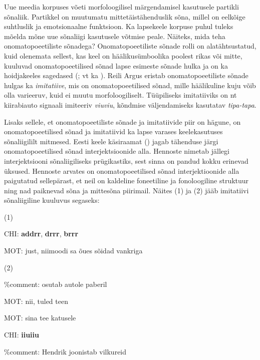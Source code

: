 \documentclass[12pt]{article}
\begin{document}
Uue meedia korpuses võeti morfoloogilisel märgendamisel kasutusele partikli sõnaliik. Partikkel on muutumatu mittetäistähenduslik sõna, millel on eelkõige suhtluslik ja emotsionaalne funktsioon. \citep[4]{UUSMEEDIA} Ka lapsekeele korpuse puhul tuleks mõelda mõne uue sõnaliigi kasutusele võtmise peale. Näiteks, mida teha onomatopoeetiliste sõnadega? Onomatopoeetiliste sõnade rolli on alatähtsustatud, kuid olenemata sellest, kas keel on häälikusümboolika poolest rikas või mitte, kuuluvad onomatopoeetilised sõnad lapse esimeste sõnade hulka ja on ka hoidjakeeles sagedased (\citealp{Laing_1}; vt ka \citealp{Laing_2}). Reili Argus eristab onomatopoeetiliste sõnade hulgas ka \emph{imitatiive}, mis on onomatopoeetilised sõnad, mille häälikuline kuju võib olla varieeruv, kuid ei muutu morfoloogiliselt. Tüüpiliseks imitatiiviks on nt kiirabiauto signaali imiteeriv \emph{viuviu}, kõndmise väljendamiseks kasutatav \emph{tipa-tapa}. \citep[19--22]{IMITATIIV}

Lisaks sellele, et onomatopoeetiliste sõnade ja imitatiivide piir on hägune, on onomatopoeetilised sõnad ja imitatiivid ka lapse varases keelekasutuses sõnaliigililt mitmesed. \citep[20--21]{IMITATIIV} Eesti keele käsiraamat (\citealp{EKK}) jagab tähenduse järgi onomatopoeetilised sõnad interjektsioonide alla. Hennoste nimetab jällegi interjektsiooni sõnaliigiliseks prügikastiks, sest sinna on pandud kokku erinevad üksused. Hennoste arvates on onomatopoeetilised sõnad interjektioonide alla paigutatud sellepärast, et neil on kaldeline foneetiline ja fonoloogiline struktuur ning nad paiknevad sõna ja mittesõna piirimail. \citep[67]{Hennoste} Näites (1) ja (2) jääb imitatiivi sõnaliigiline kuuluvus segaseks:

(1)
\begin{description}
    \item *CHI: \textbf{addrr}, \textbf{drrr}, \textbf{brrr}
    \item *MOT: just, niimoodi sa õues sõidad vankriga \citep[27]{IMITATIIV}
\end{description}

(2)

\%comment: osutab autole paberil
\begin{description}
    \item *MOT: nii, tuled teen
    \item *MOT: sina tee katusele
    \item *CHI: \textbf{iiuiiu}
\end{description}
\%comment: Hendrik joonistab vilkureid \citep[28]{IMITATIIV}
\end{document}
